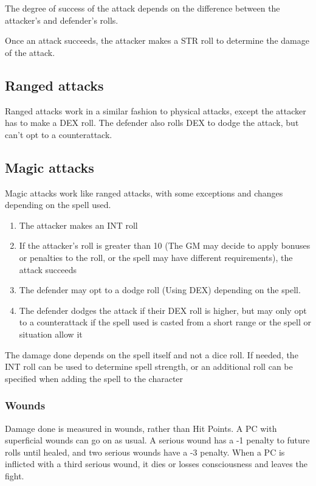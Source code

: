 \par 
The degree of success of the attack depends on the difference between the attacker's and defender's rolls.
\par 
Once an attack succeeds, the attacker makes a STR roll to determine the damage of the attack. 

\subsection{Ranged attacks}

Ranged attacks work in a similar fashion to physical attacks, except the attacker has to make a DEX roll. The defender also rolls DEX to dodge the attack, but can't opt to a counterattack.

\subsection{Magic attacks}

Magic attacks work like ranged attacks, with some exceptions and changes depending on the spell used. 

\begin{enumerate}
\item The attacker makes an INT roll
\item If the attacker's roll is greater than 10 (The GM may decide to apply bonuses or penalties to the roll, or the spell may have different requirements), the attack succeeds
\item The defender may opt to a dodge roll (Using DEX) depending on the spell.
\item The defender dodges the attack if their DEX roll is higher, but may only opt to a counterattack if the spell used is casted from a short range or the spell or situation allow it
\end{enumerate}

\par 
The damage done depends on the spell itself and not a dice roll. If needed, the INT roll can be used to determine spell strength, or an additional roll can be specified when adding the spell to the character

\subsubsection*{Wounds}

Damage done is measured in wounds, rather than Hit Points. A PC with superficial wounds can go on as usual. A serious wound has a -1 penalty to future rolls until healed, and two serious wounds have a -3 penalty. When a PC is inflicted with a third serious wound, it dies or losses consciousness and leaves the fight. 

